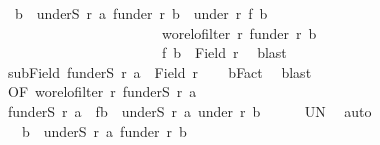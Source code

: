 \begin{isabellebody}
\ \ {\isachardoublequoteopen}{\isasymforall}b\ {\isasymin}\ underS\ r\ a{\isachardot}{\kern0pt}\ f{\isacharbackquote}{\kern0pt}{\isacharparenleft}{\kern0pt}under\ r\ b{\isacharparenright}{\kern0pt}\ {\isacharequal}{\kern0pt}\ under\ r{\isacharprime}{\kern0pt}\ {\isacharparenleft}{\kern0pt}f\ b{\isacharparenright}{\kern0pt}\ {\isasymand}\isanewline
\ \ \ \ \ \ \ \ \ \ \ \ \ \ \ \ \ \ \ \ \ \ \ wo{\isacharunderscore}{\kern0pt}rel{\isachardot}{\kern0pt}ofilter\ r{\isacharprime}{\kern0pt}\ {\isacharparenleft}{\kern0pt}f{\isacharbackquote}{\kern0pt}{\isacharparenleft}{\kern0pt}under\ r\ b{\isacharparenright}{\kern0pt}{\isacharparenright}{\kern0pt}\ {\isasymand}\isanewline
\ \ \ \ \ \ \ \ \ \ \ \ \ \ \ \ \ \ \ \ \ \ \ f\ b\ {\isasymin}\ Field\ r{\isacharprime}{\kern0pt}{\isachardoublequoteclose}\ \isamarkupfalse%
\ blast\isanewline
\ \ \isanewline
\ \ \isamarkupfalse%
\ subField{\isacharcolon}{\kern0pt}\ {\isachardoublequoteopen}f{\isacharbackquote}{\kern0pt}{\isacharparenleft}{\kern0pt}underS\ r\ a{\isacharparenright}{\kern0pt}\ {\isasymle}\ Field\ r{\isacharprime}{\kern0pt}{\isachardoublequoteclose}\isanewline
\ \ \isamarkupfalse%
\ bFact\ \isamarkupfalse%
\ blast\isanewline
\ \ \isanewline
\ \ \isamarkupfalse%
\ OF{\isacharprime}{\kern0pt}{\isacharcolon}{\kern0pt}\ {\isachardoublequoteopen}wo{\isacharunderscore}{\kern0pt}rel{\isachardot}{\kern0pt}ofilter\ r{\isacharprime}{\kern0pt}\ {\isacharparenleft}{\kern0pt}f{\isacharbackquote}{\kern0pt}{\isacharparenleft}{\kern0pt}underS\ r\ a{\isacharparenright}{\kern0pt}{\isacharparenright}{\kern0pt}{\isachardoublequoteclose}\isanewline
\ \ \isamarkupfalse%
{\isacharminus}{\kern0pt}\isanewline
\ \ \ \ \isamarkupfalse%
\ {\isachardoublequoteopen}f{\isacharbackquote}{\kern0pt}{\isacharparenleft}{\kern0pt}underS\ r\ a{\isacharparenright}{\kern0pt}\ {\isacharequal}{\kern0pt}\ f{\isacharbackquote}{\kern0pt}{\isacharparenleft}{\kern0pt}{\isasymUnion}b\ {\isasymin}\ underS\ r\ a{\isachardot}{\kern0pt}\ under\ r\ b{\isacharparenright}{\kern0pt}{\isachardoublequoteclose}\isanewline
\ \ \ \ \isamarkupfalse%
\ UN\ \isamarkupfalse%
\ auto\isanewline
\ \ \ \ \isamarkupfalse%
\ \isamarkupfalse%
\ {\isachardoublequoteopen}{\isasymdots}\ {\isacharequal}{\kern0pt}\ {\isacharparenleft}{\kern0pt}{\isasymUnion}b\ {\isasymin}\ underS\ r\ a{\isachardot}{\kern0pt}\ f{\isacharbackquote}{\kern0pt}{\isacharparenleft}{\kern0pt}under\ r\ b{\isacharparenright}{\kern0pt}{\isacharparenright}{\kern0pt}{\isachardoublequoteclose}\ \isamarkupfalse%

\end{isabellebody}
